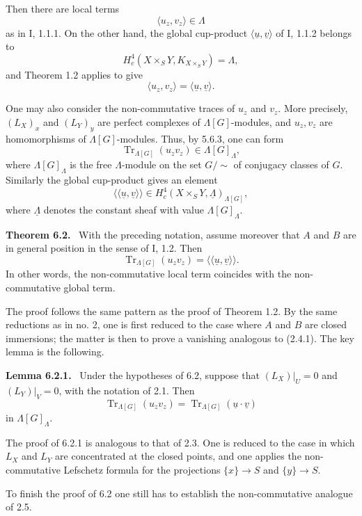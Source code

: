 \documentclass[11pt]{article}
\theoremstyle{plain}
\theoremstyle{definition}
\theoremstyle{remark}
\newenvironment{statement}[1]{\par\medskip\noindent\textbf{#1.}\ }{\par\medskip}
\DeclareMathOperator{\Tr}{Tr}
\begin{document}
Then there are local terms
\[
      \langle u_z,v_z\rangle\in\Lambda
\]
as in I, 1.1.1. On the other hand, the global cup-product
$\langle \underline u,\underline v\rangle$ of I, 1.1.2 belongs to
\[
      H_c^4(X\times_S Y,K_{X\times_S Y})=\Lambda,
\]
and Theorem 1.2 applies to give
\[
      \langle u_z,v_z\rangle=\langle \underline u,\underline v\rangle.
\]

One may also consider the non-commutative traces of $u_z$ and $v_z$. More precisely,
$(L_X)_x$ and $(L_Y)_y$ are perfect complexes of $\Lambda[G]$-modules, and
$u_z,v_z$ are homomorphisms of $\Lambda[G]$-modules. Thus, by 5.6.3, one can form
\[
       \Tr_{\Lambda[G]}(u_zv_z)\in \Lambda[G]_{\Lambda},
\]
where $\Lambda[G]_{\Lambda}$ is the free $\Lambda$-module on the set $G/\sim$ of
conjugacy classes of $G$. Similarly the global cup-product gives an element
\[
       \langle\!\langle\underline u,\underline v\rangle\!\rangle
       \in H_c^4(X\times_S Y,\underline\Lambda)_{\Lambda[G]},
\]
where $\underline\Lambda$ denotes the constant sheaf with value
$\Lambda[G]_\Lambda$.

\begin{statement}{Theorem 6.2}
With the preceding notation, assume moreover that $A$ and $B$ are in general
position in the sense of I, 1.2. Then
\[
       \Tr_{\Lambda[G]}(u_zv_z)
       =\langle\!\langle\underline u,\underline v\rangle\!\rangle .
\]
In other words, the non-commutative local term coincides with the non-commutative
global term.
\end{statement}

The proof follows the same pattern as the proof of Theorem 1.2. By the same
reductions as in no. 2, one is first reduced to the case where $A$ and $B$ are
closed immersions; the matter is then to prove a vanishing analogous to (2.4.1).
The key lemma is the following.

\begin{statement}{Lemma 6.2.1}
Under the hypotheses of 6.2, suppose that $(L_X)|_U=0$ and $(L_Y)|_V=0$, with the
notation of 2.1. Then
\[
       \Tr_{\Lambda[G]}(u_zv_z)=\Tr_{\Lambda[G]}(\underline u\cdot\underline v)
\]
in $\Lambda[G]_{\Lambda}$.
\end{statement}

The proof of 6.2.1 is analogous to that of 2.3. One is reduced to the case in which
$L_X$ and $L_Y$ are concentrated at the closed points, and one applies the
non-commutative Lefschetz formula for the projections
$\{x\}\to S$ and $\{y\}\to S$.

To finish the proof of 6.2 one still has to establish the non-commutative analogue
of 2.5.
\end{document}

